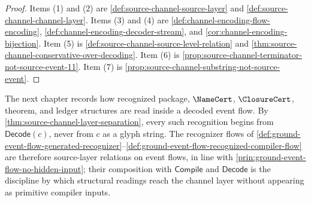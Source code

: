 \begin{proof}
Items (1) and (2) are \autoref{def:source-channel-source-layer} and \autoref{def:source-channel-channel-layer}. Items (3) and (4) are \autoref{def:channel-encoding-flow-encoding}, \autoref{def:channel-encoding-decoder-stream}, and \autoref{cor:channel-encoding-bijection}. Item (5) is \autoref{def:source-channel-source-level-relation} and \autoref{thm:source-channel-conservative-over-decoding}. Item (6) is \autoref{prop:source-channel-terminator-not-source-event-11}. Item (7) is \autoref{prop:source-channel-substring-not-source-event}.
\end{proof}

\begin{remark}[Outlook]
\label{rem:source-channel-outlook}
The next chapter records how recognized package, $\NameCert$, $\ClosureCert$, theorem, and ledger structures are read inside a decoded event flow. By \autoref{thm:source-channel-layer-separation}, every such recognition begins from $\mathsf{Decode}(c)$, never from $c$ as a glyph string. The recognizer flows of \autoref{def:ground-event-flow-generated-recognizer}--\autoref{def:ground-event-flow-recognized-compiler-flow} are therefore source-layer relations on event flows, in line with \autoref{prin:ground-event-flow-no-hidden-input}; their composition with $\mathsf{Compile}$ and $\mathsf{Decode}$ is the discipline by which structural readings reach the channel layer without appearing as primitive compiler inputs.
\end{remark}

